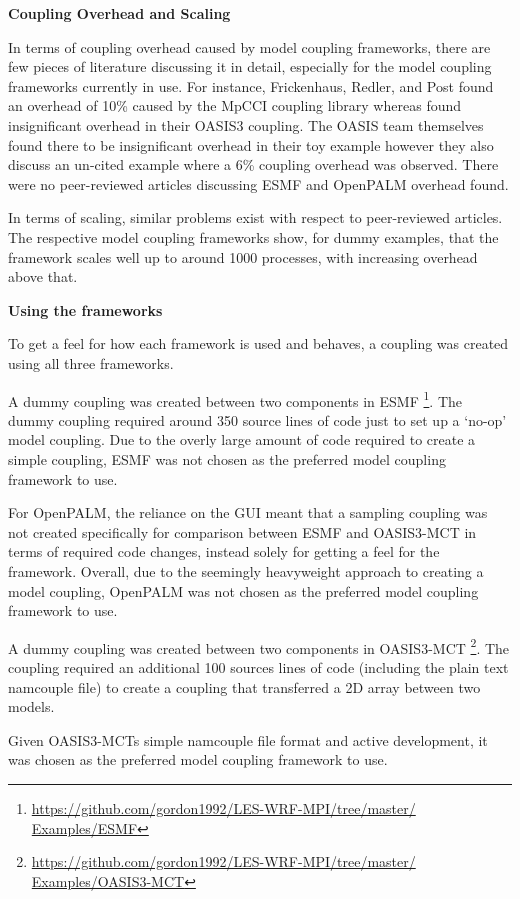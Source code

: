 \textbf{Coupling Overhead and Scaling}

In terms of coupling overhead caused by model coupling frameworks, there are few
pieces of literature discussing it in detail, especially for the model coupling
frameworks currently in use. For instance, Frickenhaus, Redler, and Post
\cite{StephanFrickenhausReneRedler2001} found an overhead of 10\% caused by the
MpCCI coupling library whereas \cite{Mogensen} found insignificant overhead in
their OASIS3 coupling. The OASIS team themselves found there to be insignificant
overhead in their toy example \cite{Valcke} however they also discuss an
un-cited example where a 6\% coupling overhead was observed. There were no
peer-reviewed articles discussing ESMF and OpenPALM overhead found.

In terms of scaling, similar problems exist with respect to peer-reviewed
articles. The respective model coupling frameworks show, for dummy examples,
that the framework scales well up to around 1000 processes, with increasing
overhead above that.

\textbf{Using the frameworks}

To get a feel for how each framework is used and behaves, a coupling was created
using all three frameworks.

A dummy coupling was created between two components in ESMF
\footnote{\url{https://github.com/gordon1992/LES-WRF-MPI/tree/master/
Examples/ESMF}}. The dummy coupling required around 350 source lines of code
just to set up a `no-op' model coupling. Due to the overly large amount of code
required to create a simple coupling, ESMF was not chosen as the preferred model
coupling framework to use.

For OpenPALM, the reliance on the GUI meant that a sampling coupling was not
created specifically for comparison between ESMF and OASIS3-MCT in terms of
required code changes, instead solely for getting a feel for the framework.
Overall, due to the seemingly heavyweight approach to creating a model coupling,
OpenPALM was not chosen as the preferred model coupling framework to use.

A dummy coupling was created between two components in OASIS3-MCT
\footnote{\url{https://github.com/gordon1992/LES-WRF-MPI/tree/master/
Examples/OASIS3-MCT}}. The coupling required an additional 100 sources lines of
code (including the plain text namcouple file) to create a coupling that
transferred a 2D array between two models.

Given OASIS3-MCTs simple namcouple file format and active development, it was
chosen as the preferred model coupling framework to use.
